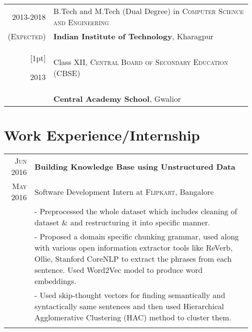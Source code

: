 \documentclass[a4paper,10pt]{extarticle} %
\begin{document}
\begin{tabular}{r|p{16cm}}	
\normalsize{2013-2018} & \small{B.Tech and M.Tech (Dual Degree) in} \textsc{\small{Computer Science and Engineering}}\\
\textsc{\normalsize{(Expected)}}&\small{\textbf{Indian Institute of Technology}, Kharagpur}\\
[1pt]


\normalsize{2013}& \small{Class XII,} \textsc{}\textsc{\small{Central Board of Secondary Education (CBSE)}} \\
&\small{\textbf{Central Academy School}, Gwalior}\\



\end{tabular}

\section{\large{Work Experience/Internship}}

\begin{tabular}{r|p{16cm}}

\textsc{\normalsize{Jun 2016}} & \textbf{\normalsize{Building Knowledge Base using Unstructured Data}}\\
\textsc{\normalsize{May 2016}} & \small{Software Development Intern at} \textsc{Flipkart}\small{, Bangalore}\\

& \footnotesize{- Preprocessed the whole dataset which includes cleaning of dataset \& and restructuring it into specific manner.}\\
& \footnotesize{- Proposed a domain specific chunking grammar, used along with various open information extractor tools like ReVerb, Ollie, Stanford CoreNLP to extract the phrases from each sentence. Used Word2Vec model to produce word embeddings.}\\
& \footnotesize{- Used skip-thought vectors for finding semantically and syntactically same sentences and then used Hierarchical Agglomerative Clustering (HAC) method to cluster them.}\\
\multicolumn{2}{c}{} \\
\end{tabular}
\end{document}
